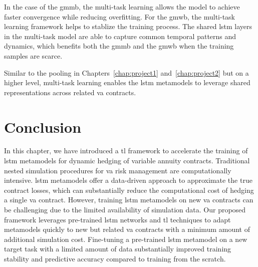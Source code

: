 In the case of the \gls{gmmb}, the multi-task learning allows the model to achieve faster convergence while reducing overfitting.
For the \gls{gmwb}, the multi-task learning framework helps to stablize the training process.
The shared \gls{lstm} layers in the multi-task model are able to capture common temporal patterns and dynamics, which benefits both the \gls{gmmb} and the \gls{gmwb} when the training samples are scarce.

Similar to the pooling in Chapters~\ref{chap:project1} and~\ref{chap:project2} but on a higher level, multi-task learning enables the \gls{lstm} metamodels to leverage shared representations across related \gls{va} contracts.



\section{Conclusion} \label{sec3:conclusion}

In this chapter, we have introduced a \gls{tl} framework to accelerate the training of \gls{lstm} metamodels for dynamic hedging of variable annuity contracts.
Traditional nested simulation procedures for \gls{va} risk management are computationally intensive.
\gls{lstm} metamodels offer a data-driven approach to approximate the true contract losses, which can substantially reduce the computational cost of hedging a single \gls{va} contract.
However, training \gls{lstm} metamodels on new \gls{va} contracts can be challenging due to the limited availability of simulation data.
Our proposed framework leverages pre-trained \gls{lstm} networks and \gls{tl} techniques to adapt metamodels quickly to new but related \gls{va} contracts with a minimum amount of additional simulation cost.
Fine-tuning a pre-trained \gls{lstm} metamodel on a new target task with a limited amount of data substantially improved training stability and predictive accuracy compared to training from the scratch. 

